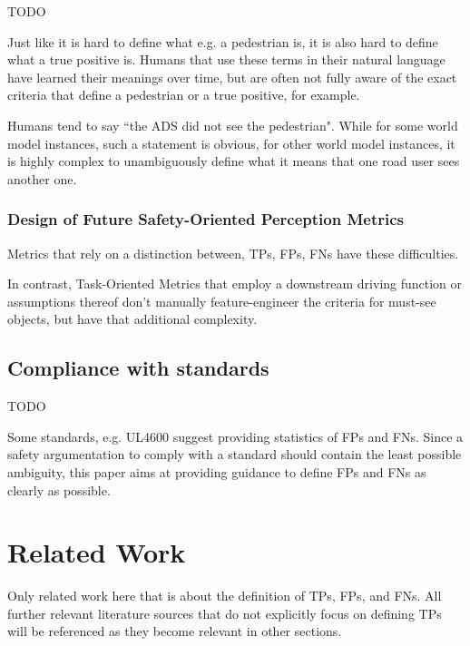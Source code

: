 \documentclass[conference]{IEEEtran}
\begin{document}
TODO

Just like it is hard to define what e.g. a pedestrian is, it is also hard to define what a true positive is. 
Humans that use these terms in their natural language have learned their meanings over time, but are often not fully aware of the exact criteria that define a pedestrian or a true positive, for example.  

Humans tend to say ``the ADS did not see the pedestrian". While for some world model instances, such a statement is obvious, for other world model instances, it is highly complex to unambiguously define what it means that one road user sees another one. 


\subsubsection{Design of Future Safety-Oriented Perception Metrics}

Metrics that rely on a distinction between, TPs, FPs, FNs have these difficulties. 

In contrast, Task-Oriented Metrics that employ a downstream driving function or assumptions thereof don't manually feature-engineer the criteria for must-see objects, but have that additional complexity. 


\subsection{Compliance with standards}

TODO

Some standards, e.g. UL4600 \cite[Sec. 8.4.1.2]{UL4600_voting_2019} suggest providing statistics of FPs and FNs. 
Since a safety argumentation to comply with a standard should contain the least possible ambiguity, this paper aims at providing guidance to define FPs and FNs as clearly as possible. 







\section{Related Work}
\label{sec:related_work}

Only related work here that is about the definition of TPs, FPs, and FNs. 
All further relevant literature sources that do not explicitly focus on defining TPs will be referenced as they become relevant in other sections. 
\end{document}

